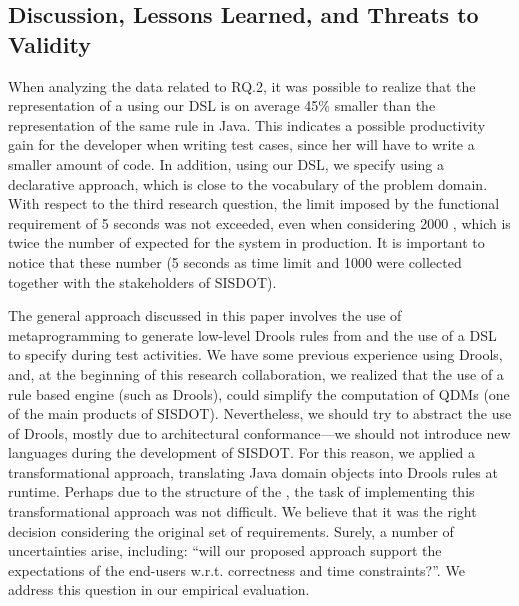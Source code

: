 \subsection{Discussion, Lessons Learned, and Threats to Validity}

When analyzing the data related to RQ.2, it was possible to realize that the representation 
of a \shc using our DSL is on average 45\% smaller than the representation of the same rule in Java. 
This indicates a possible productivity gain for the developer when writing test cases, 
since her will have to write a smaller amount of code. In addition, using our DSL, we 
specify \callers using a declarative approach, which is close to the vocabulary of 
the problem domain. With respect to the third research question, the limit imposed by the
functional requirement of 5 seconds was not exceeded, even when considering 2000 \callers,
which is twice the number of \callers expected for the system in production. It is important
to notice that these number (5 seconds as time limit and 1000 \callers were collected together
with the stakeholders of SISDOT).

The general approach discussed in this paper involves the use of metaprogramming
to generate low-level Drools rules from \callers and the use of a DSL to specify
\callers during test activities. We have some previous experience using Drools,
and, at the beginning of this research collaboration, we realized that the use of
a rule based engine (such as Drools), could simplify the computation of QDMs
(one of the main products of SISDOT). Nevertheless, we should try to abstract
the use of Drools, mostly due to architectural conformance---we should not
introduce new languages during the development of SISDOT. For this reason, we applied a
transformational approach, translating Java domain objects into
Drools rules at runtime. Perhaps due to the structure of the \callers, the task of implementing
this transformational approach was not difficult. We believe that it was the
right decision considering the original set of requirements. Surely, a number of uncertainties arise,
including: ``will our proposed approach support
the expectations of the end-users w.r.t. correctness
and time constraints?''. We address this question in our empirical evaluation.

